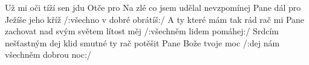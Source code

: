 \begin{TEXT}{Už mi oči tíží sen}
\SLOKA {}      jdu \NL
{}     \NL
Otče pro  
   
\SLOKA Na zlé co jsem udělal nevzpomínej Pane dál \NL
pro Ježíše jeho kříž \NL
/:všechno v dobré obrátíš:/ 
\SLOKA A ty které mám tak rád rač mi Pane zachovat \NL
nad svým světem lítost měj \NL
/:všechněm lidem pomáhej:/ 
\SLOKA Srdcím nešťastným dej klid smutné ty rač potěšit \NL
Pane Bože tvoje moc \NL
/:dej nám všechněm dobrou noc:/ \NL
\end{TEXT}
